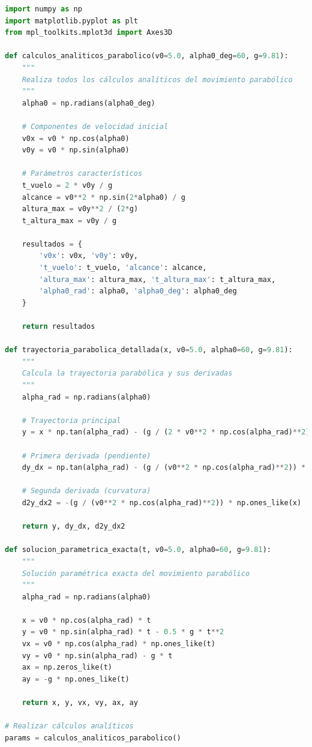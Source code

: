 \documentclass{article}
\begin{document}
	\begin{lstlisting}[language=Python, caption={Análisis completo del movimiento parabólico}]
import numpy as np
import matplotlib.pyplot as plt
from mpl_toolkits.mplot3d import Axes3D

def calculos_analiticos_parabolico(v0=5.0, alpha0_deg=60, g=9.81):
    """
    Realiza todos los cálculos analíticos del movimiento parabólico
    """
    alpha0 = np.radians(alpha0_deg)
    
    # Componentes de velocidad inicial
    v0x = v0 * np.cos(alpha0)
    v0y = v0 * np.sin(alpha0)
    
    # Parámetros característicos
    t_vuelo = 2 * v0y / g
    alcance = v0**2 * np.sin(2*alpha0) / g
    altura_max = v0y**2 / (2*g)
    t_altura_max = v0y / g
    
    resultados = {
        'v0x': v0x, 'v0y': v0y,
        't_vuelo': t_vuelo, 'alcance': alcance,
        'altura_max': altura_max, 't_altura_max': t_altura_max,
        'alpha0_rad': alpha0, 'alpha0_deg': alpha0_deg
    }
    
    return resultados

def trayectoria_parabolica_detallada(x, v0=5.0, alpha0=60, g=9.81):
    """
    Calcula la trayectoria parabólica y sus derivadas
    """
    alpha_rad = np.radians(alpha0)
    
    # Trayectoria principal
    y = x * np.tan(alpha_rad) - (g / (2 * v0**2 * np.cos(alpha_rad)**2)) * x**2
    
    # Primera derivada (pendiente)
    dy_dx = np.tan(alpha_rad) - (g / (v0**2 * np.cos(alpha_rad)**2)) * x
    
    # Segunda derivada (curvatura)
    d2y_dx2 = -(g / (v0**2 * np.cos(alpha_rad)**2)) * np.ones_like(x)
    
    return y, dy_dx, d2y_dx2

def solucion_parametrica_exacta(t, v0=5.0, alpha0=60, g=9.81):
    """
    Solución paramétrica exacta del movimiento parabólico
    """
    alpha_rad = np.radians(alpha0)
    
    x = v0 * np.cos(alpha_rad) * t
    y = v0 * np.sin(alpha_rad) * t - 0.5 * g * t**2
    vx = v0 * np.cos(alpha_rad) * np.ones_like(t)
    vy = v0 * np.sin(alpha_rad) - g * t
    ax = np.zeros_like(t)
    ay = -g * np.ones_like(t)
    
    return x, y, vx, vy, ax, ay

# Realizar cálculos analíticos
params = calculos_analiticos_parabolico()


\end{lstlisting}
\end{document}
